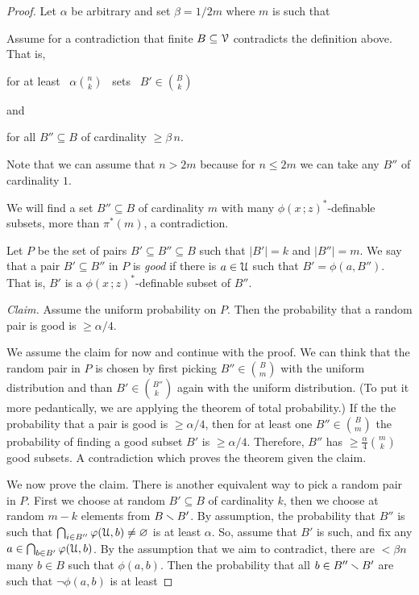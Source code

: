 \documentclass[scombinatorics.tex]{subfiles}
\begin{document}
\begin{proof}
Let $\alpha$ be arbitrary and set $\beta=1/2m$ where $m$ is such that 


Assume for a contradiction that finite $B\subseteq\EuScript V$ contradicts the definition above.
That is,
 
\hfill for at least \ $\displaystyle\alpha{n\choose k}$ \ sets \ $\displaystyle B'\in{B\choose k}$

and

\hfill for all $B''\subseteq B$ of cardinality $\ge\beta\,n$.

Note that we can assume that $n>2m$ because for $n\le2m$ we can take any $B''$ of cardinality $1$.

We will find a set $B''\subseteq B$ of cardinality $m$ with many $\phi(x\,;z)^*$-definable subsets, more than $\pi^*(m)$, a contradiction.

Let $P$ be the set of pairs $B'\subseteq B''\subseteq B$ such that $|B'|=k$ and $|B''|=m$.
We say that a pair $B'\subseteq B''$ in $P$ is \textit{good\/} if there is $a\in\EuScript U$ such that $B'=\phi(a,B'')$.
That is, $B'$ is a $\phi(x\,;z)^*$-definable subset of $B''$.

\textit{Claim.} Assume the uniform probability on $P$.
Then the probability that a random pair is good is $\ge\alpha/4$.

We assume the claim for now and continue with the proof.
We can think that the random pair in $P$ is chosen by first picking $B''\in{B\choose m}$ with the uniform distribution and than $B'\in{B''\choose k\phantom{'}}$ again with the uniform distribution. 
(To put it more pedantically, we are applying the theorem of total probability.)
If the the probability that a pair is good is $\ge\alpha/4$, then for at least one $B''\in{B\choose m}$ the probability of finding a good subset $B'$ is $\ge\alpha/4$.
Therefore, $B''$ has $\ge\frac\alpha4{m\choose k}$ good subsets.
A contradiction which proves the theorem given the claim.

We now prove the claim.
There is another equivalent way to pick a random pair in $P$.
First we choose at random $B'\subseteq B$ of cardinality $k$, then we choose at random $m-k$ elements from $B\smallsetminus B'$.
By assumption, the probability that $B''$ is such that $\bigcap_{i\in B''}\varphi(\EuScript U,b)\neq\varnothing$ is at least $\alpha$.
So, assume that $B'$ is such, and fix any $a\in \bigcap_{b\in B'}\varphi(\EuScript U,b)$.
By the assumption that we aim to contradict, there are $<\beta n$ many $b\in B$ such that $\phi(a,b)$.
Then the probability that all $b\in B''\smallsetminus B'$ are such that $\neg\phi(a,b)$ is at least


\end{proof}
\end{document}

